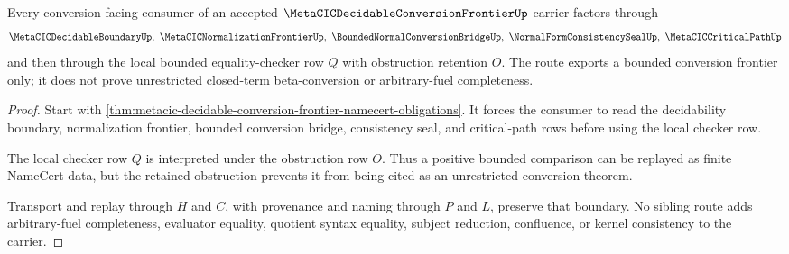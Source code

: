 \begin{theorem}
\label{thm:metacic-decidable-conversion-frontier-bounded-route}
Every conversion-facing consumer of an accepted $\MetaCICDecidableConversionFrontierUp$ carrier factors through
$$
\MetaCICDecidableBoundaryUp,\ \MetaCICNormalizationFrontierUp,\ \BoundedNormalConversionBridgeUp,\ \NormalFormConsistencySealUp,\ \MetaCICCriticalPathUp
$$
and then through the local bounded equality-checker row $Q$ with obstruction retention $O$. The route exports a bounded conversion frontier only; it does not prove unrestricted closed-term beta-conversion or arbitrary-fuel completeness.
\end{theorem}
\begin{proof}
Start with \autoref{thm:metacic-decidable-conversion-frontier-namecert-obligations}. It forces the consumer to read the decidability boundary, normalization frontier, bounded conversion bridge, consistency seal, and critical-path rows before using the local checker row.

The local checker row $Q$ is interpreted under the obstruction row $O$. Thus a positive bounded comparison can be replayed as finite NameCert data, but the retained obstruction prevents it from being cited as an unrestricted conversion theorem.

Transport and replay through $H$ and $C$, with provenance and naming through $P$ and $L$, preserve that boundary. No sibling route adds arbitrary-fuel completeness, evaluator equality, quotient syntax equality, subject reduction, confluence, or kernel consistency to the carrier.
\end{proof}

